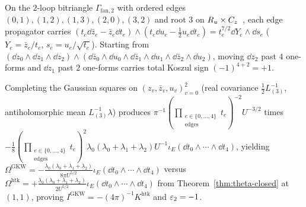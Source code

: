 \begin{example}[{Two-loop $3\mathrm{D}$ $\mathcal{N}=2$ bitriangle orientation $\eps_2 = -1$ from ordered Gaussian pushforwards}]
\label{ex:3d-eps2-sign}
On the $2$-loop bitriangle $\Gamma_{\mathrm{fan},2}$ with ordered edges $(0,1),(1,2),(1,3),(2,0),(3,2)$ and root $3$ on $R_u\times C_z$~\cite{GKW,Repo9e833c8}, each edge propagator carries $(t_e\dd\bar{z}_e - \bar{z}_e\dd t_e)\wedge(t_e\dd u_e - \frac{1}{2}u_e\dd t_e) = t_e^{7/2}\dd Y_e\wedge\dd s_e$ ($Y_e = \bar{z}_e/t_e$, $s_e = u_e/\sqrt{t_e}$). Starting from $(\dd z_0\wedge\dd z_1\wedge\dd z_2)\wedge(\dd\bar{z}_0\wedge\dd u_0\wedge\dd\bar{z}_1\wedge\dd u_1\wedge\dd\bar{z}_2\wedge\dd u_2)$, moving $\dd z_2$ past $4$ one-forms and $\dd z_1$ past $2$ one-forms carries total Koszul sign $(-1)^{4+2} = +1$.

Completing the Gaussian squares on $(z_v,\bar{z}_v,u_v)_{v=0}^2$ (real covariance $\frac{1}{2}L_{(3)}^{-1}$, antiholomorphic mean $L_{(3)}^{-1}\lambda$) produces $\pi^{-1}(\prod_{\substack{e\in\{0,\dots,4\}\\\mathrm{edges}}}t_e)^{-2}U^{-3/2}$ times $-\frac{1}{8}(\prod_{\substack{e\in\{0,\dots,4\}\\\mathrm{edges}}}t_e)^2\lambda_0(\lambda_0+\lambda_1+\lambda_2)U^{-1}\iota_E(\dd t_0\wedge\cdots\wedge\dd t_4)$, yielding $\Omega^{\mathrm{GKW}} = -\frac{\lambda_0(\lambda_0+\lambda_1+\lambda_2)}{8\pi U^{5/2}}\iota_E(\dd t_0\wedge\cdots\wedge\dd t_4)$ versus $\Omega^{\mathrm{htk}} = +\frac{\lambda_0(\lambda_0+\lambda_1+\lambda_2)}{2U^{5/2}}\iota_E(\dd t_0\wedge\cdots\wedge\dd t_4)$ from Theorem~\ref{thm:theta-closed} at $(1,1)$, proving $I^{\mathrm{GKW}} = -(4\pi)^{-1}K^{\mathrm{htk}}$ and $\eps_2 = -1$.
\end{example}

